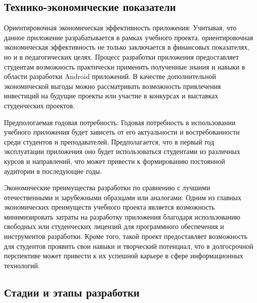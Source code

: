 \documentclass[a4paper, 14pt]{article}
\begin{document}
\subsection{Технико-экономические показатели}
Ориентировочная экономическая эффективность приложения: Учитывая, что данное приложение разрабатывается в рамках
учебного проекта, ориентировочная экономическая эффективность не только заключается в финансовых показателях, но и в
педагогических целях. Процесс разработки приложения предоставляет студентам возможность практически применить полученные
знания и навыки в области разработки Android приложений. В качестве дополнительной экономической выгоды можно
рассматривать возможность привлечения инвестиций на будущие проекты или участие в конкурсах и выставках студенческих проектов.

Предпологаемая годовая потребность: Годовая потребность в использовании учебного приложения будет зависеть от его
актуальности и востребованности среди студентов и преподавателей. Предполагается, что в первый год эксплуатации
приложения оно будет использоваться студентами из различных курсов и направлений, что может привести к формированию
постоянной аудитории в последующие годы.

Экономические преимущества разработки по сравнению с лучшими отечественными и зарубежными образцами или аналогами:
Одним из главных экономических преимуществ учебного проекта является возможность минимизировать затраты на разработку
приложения благодаря использованию свободных или студенческих лицензий для программного обеспечения и инструментов
разработки. Кроме того, такой проект предоставляет возможность для студентов проявить свои навыки и творческий
потенциал, что в долгосрочной перспективе может привести к их успешной карьере в сфере информационных технологий.

\subsection{Стадии и этапы разработки}
\end{document}
